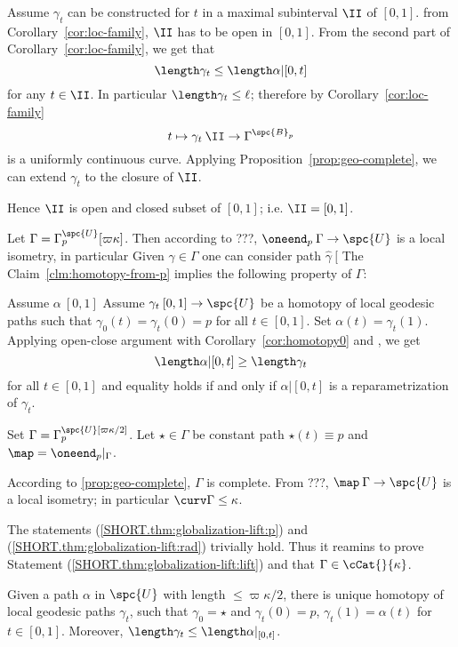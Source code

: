 Assume $\gamma_t$ can be constructed for $t$ in a maximal subinterval $\II$ of $[0,1]$.
from Corollary~\ref{cor:loc-family}, $\II$ has to be open in $[0,1]$.
From the second part of Corollary~\ref{cor:loc-family},
we get that
$$\length\gamma_t\le\length\alpha|[0,t]$$
for any $t\in\II$.
In particular $\length\gamma_t\le\ell$;
therefore by Corollary~\ref{cor:loc-family}
$$t\mapsto\gamma_t\:\II\to\Gamma^{\spc{B}_p}$$ 
is a uniformly continuous curve.
Applying  Proposition~\ref{prop:geo-complete}, we can extend $\gamma_t$ to the closure of $\II$.

Hence $\II$ is open and closed subset of $[0,1]$;
i.e. $\II=[0,1]$.
\qeds

Let $\Gamma=\Gamma^\spc{U}_p[\varpi\kappa]$.
Then according to ???, $\oneend_p\:\Gamma\to\spc{U}$ is a local isometry, in particular 
Given $\gamma\in\Gamma$ one can consider path $\hat\gamma\:[$
The Claim~\ref{clm:homotopy-from-p} implies the following property of $\Gamma$:




Assume $\alpha\:[0,1]$
Assume $\gamma_t\:[0,1]\to\spc{U}$ be a homotopy of local geodesic paths
such that $\gamma_0(t)=\gamma_t(0)=p$ for all $t\in[0,1]$.
Set $\alpha(t)=\gamma_t(1)$.
Applying open-close argument with Corollary~\ref{cor:homotopy0} and , we get
$$\length\alpha|[0,t]\ge\length\gamma_t$$
for all $t\in [0,1]$ 
and equality holds if and only if $\alpha|[0,t]$ is a reparametrization of $\gamma_t$.





Set $\Gamma=\Gamma_{p}^\spc{U}[\varpi\kappa/2]$.
Let $\star\in\Gamma$ be constant path $\star(t)\equiv p$
and $\map=\oneend_p|_\Gamma$.

According to \ref{prop:geo-complete}, $\Gamma$ is complete.
From ???,  $\map\:\Gamma\to \spc{U}$ is a local isometry;
in particular $\curv\Gamma\le\kappa$.



The statements (\ref{SHORT.thm:globalization-lift:p}) and (\ref{SHORT.thm:globalization-lift:rad}) trivially hold.
Thus it reamins to prove 
Statement (\ref{SHORT.thm:globalization-lift:lift})
and that $\Gamma\in\cCat{}{\kappa}$.

Given a path $\alpha$ in $\spc{U}$ with length $\le\varpi\kappa/2$,
there is unique homotopy of local geodesic paths $\gamma_t$, 
such that $\gamma_0=\star$ and
$\gamma_t(0)=p$, $\gamma_t(1)=\alpha(t)$ for $t\in[0,1]$.
Moreover, $\length\gamma_t\le\length\alpha|_{[0,t]}$.


